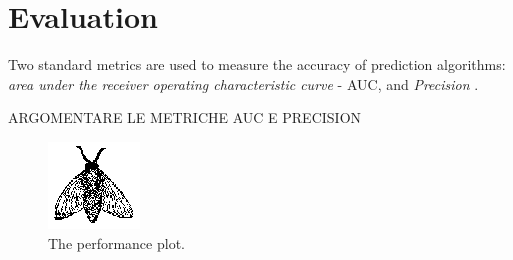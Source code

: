 \section{Evaluation}
\label{sec:evaluation}

Two standard metrics are used to measure the accuracy of prediction algorithms: \textit{area under the receiver operating characteristic curve} - AUC, and  \textit{Precision} \cite{Lu2011}.

ARGOMENTARE LE METRICHE AUC E PRECISION

\lipsum[1]

\begin{figure}
	\centering
	\includegraphics{./fig/fly}
	\caption{The performance plot.}
\end{figure}

\lipsum[1]
